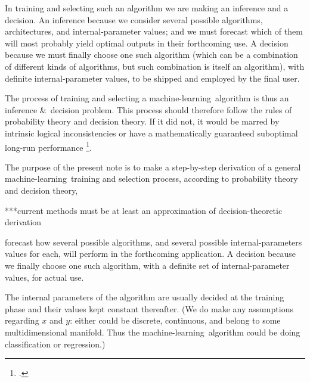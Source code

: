 \documentclass[\ifafour a4paper,12pt,\else a5paper,10pt,\fi%
onecolumn,oneside,article,%
british%
]{memoir}
\theoremstyle{remark}
\theoremstyle{innote}
\newcommand*{\citep}{\footcites}
\newcommand*{\amp}{\&}
\renewcommand*{\|}[1][]{\nonscript\:#1\vert\nonscript\:\mathopen{}}
\renewcommand*{\=}{\TextOrMath\texteq\eq}
\newcommand*{\chaps}{chs}%
\newcommand*{\eg}{{e.g.}}
\newcommand*{\ml}{machine-learning}
\begin{document}
In training and selecting such an algorithm we are making an inference and
a decision. An inference because we consider several possible algorithms,
architectures, and internal-parameter values; and we must forecast which of
them will most probably yield optimal outputs in their forthcoming use. A
decision because we must finally choose one such algorithm (which can be a
combination of different kinds of algorithms, but such combination is
itself an algorithm), with definite internal-parameter values, to be
shipped and employed by the final user.

The process of training and selecting a \ml\ algorithm is thus an inference
\amp\ decision problem. This process should therefore follow the rules of
probability theory and decision theory. If it did not, it would be marred
by intrinsic logical inconsistencies or have a mathematically guaranteed
suboptimal long-run performance
\citep{prattetal1995_r1996,berger1980_r1985,raiffaetal1961_r2000,bernardoetal1994_r2000}[esp.\
\chaps~13--14]{jaynes1994_r2003}{degroot1970_r2004}[for early works
see][]{wald1950_r1964,savage1954_r1972,neumannetal1944_r1955,bernoulli1738}[for
introductions and summaries:][]{good1952,prattetal1964,north1968}[and the
brilliant][]{raiffa1968_r1970}[it is known that human beings often do not
follow rational decision theory (nor logic for that matter); this is why
logic, probability theory, decision theory are \emph{normative}, not
descriptive, theories; see \eg][]{tversky1975,tverskyetal1981}.

The purpose of the present note is to make a step-by-step derivation of a
general \ml\ training and selection process, according to probability
theory and decision theory,

***current methods must be at least an approximation of decision-theoretic derivation


forecast how
several possible algorithms, and several possible internal-parameters
values for each, will perform in the forthcoming application. A decision
because we finally choose one such algorithm, with a definite set of
internal-parameter values, for actual use.





The internal
parameters of the algorithm are usually decided at the training phase and
their values kept constant thereafter. (We do make any assumptions
regarding $x$ and $y$: either could be discrete, continuous, and belong to
some multidimensional manifold. Thus the \ml\ algorithm could be doing
classification or regression.)
\end{document}
